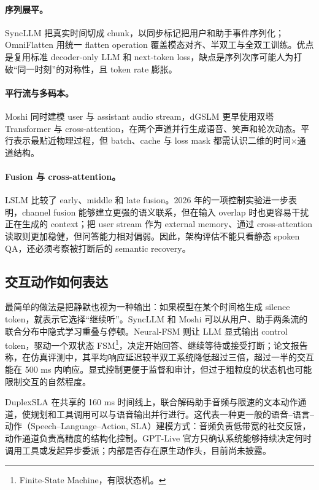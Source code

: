 \documentclass[UTF8,fontset=none,a4paper,10pt]{ctexart}
\begin{document}
\paragraph{序列展平。}
SyncLLM 把真实时间切成 chunk，以同步标记把用户和助手事件序列化；OmniFlatten 用统一 flatten operation 覆盖模态对齐、半双工与全双工训练\cite{zh:veluri2024syncllm,zh:zhang2024omniflatten}。优点是复用标准 decoder-only LLM 和 next-token loss，缺点是序列次序可能人为打破“同一时刻”的对称性，且 token rate 膨胀。

\paragraph{平行流与多码本。}
Moshi 同时建模 user 与 assistant audio stream，dGSLM 更早使用双塔 Transformer 与 cross-attention，在两个声道并行生成语音、笑声和轮次动态\cite{zh:nguyen2022dgslm,zh:defossez2024moshi}。平行表示最贴近物理过程，但 batch、cache 与 loss mask 都需认识二维的时间$\times$通道结构。

\paragraph{Fusion 与 cross-attention。}
LSLM 比较了 early、middle 和 late fusion。2026 年的一项控制实验进一步表明，channel fusion 能够建立更强的语义联系，但在输入 overlap 时也更容易干扰正在生成的 context；把 user stream 作为 external memory、通过 cross-attention 读取则更加稳健，但问答能力相对偏弱\cite{zh:ma2025lslm,zh:lu2026routing}。因此，架构评估不能只看静态 spoken QA，还必须考察被打断后的 semantic recovery。

\subsection{交互动作如何表达}

最简单的做法是把静默也视为一种输出：如果模型在某个时间格生成 silence token，就表示它选择“继续听”。SyncLLM 和 Moshi 可以从用户、助手两条流的联合分布中隐式学习重叠与停顿。Neural-FSM 则让 LLM 显式输出 control token，驱动一个双状态 FSM\footnote{Finite-State Machine，有限状态机。}，决定开始回答、继续等待或接受打断；论文报告称，在仿真评测中，其平均响应延迟较半双工系统降低超过三倍，超过一半的交互能在 500 ms 内响应\cite{zh:wang2024neuralfsm}。显式控制更便于监督和审计，但过于粗粒度的状态机也可能限制交互的自然程度。

DuplexSLA 在共享的 160 ms 时间线上，联合解码助手音频与限速的文本动作通道，使规划和工具调用可以与语音输出并行进行\cite{zh:zhang2026duplexsla}。这代表一种更一般的语音--语言--动作（Speech--Language--Action, SLA）建模方式：音频负责低带宽的社交反馈，动作通道负责高精度的结构化控制。GPT-Live 官方只确认系统能够持续决定何时调用工具或发起异步委派；内部是否存在原生动作头，目前尚未披露。
\end{document}
